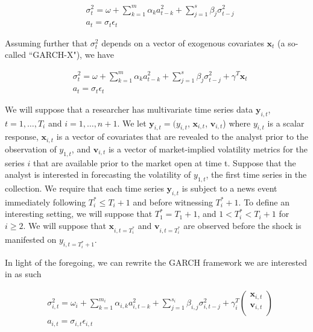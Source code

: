\documentclass[11pt]{article}
\newcommand{\x}{\textbf{x}}
\newcommand{\y}{\textbf{y}}
\theoremstyle{definition}
\begin{document}
\begin{align*}
&\sigma_{t}^{2} = \omega + \sum^{m}_{k=1}\alpha_{k}a^{2}_{t-k} + \sum_{j=1}^{s}\beta_{j}\sigma_{t-j}^{2}\\
&a_{t} = \sigma_{t}\epsilon_{t}
\end{align*}

Assuming further that $\sigma^{2}_{t}$ depends on a vector of exogenous covariates $\x_{t}$ (a so-called ``GARCH-X"), we have

\begin{align*}
&\sigma_{t}^{2} = \omega+ \sum^{m}_{k=1}\alpha_{k}a^{2}_{t-k} + \sum_{j=1}^{s}\beta_{j}\sigma_{t-j}^{2} + \gamma^{T}\x_{t}\\
&a_{t} = \sigma_{t}\epsilon_{t}
\end{align*}


We will suppose that a researcher has multivariate time series data $\y_{i,t}$, $t = 1, \ldots,  T_i$ and $i = 1, \ldots, n+1$. We let $\y_{i,t} = (y_{i,t}$, $\x_{i,t}$, $\textbf{v}_{i,t}$) where $y_{i,t}$ is a scalar response,  $\x_{i,t}$ is a vector of covariates that are revealed to the analyst prior to the observation of $y_{1,t}$, and $\textbf{v}_{i,t}$ is a vector of market-implied volatility metrics for the series $i$ that are available prior to the market open at time t.  Suppose that the analyst is interested in forecasting the volatility of $y_{1,t}$, the first time series in the collection.  We require that each time series $\y_{i,t}$ is subject to a news event immediately following $T^*_i \leq T_i + 1$ and before witnessing $T^*_i+1$. To define an interesting setting, we will suppose that $T^*_1 = T_1 + 1$, and $1 < T^*_i < T_i + 1$ for $i \geq 2$. 
We will suppose that $\x_{i,t=T^*_i}$ and $\textbf{v}_{i,t=T^*_i}$ are observed before the shock is manifested on $y_{i,t=T^*_i+1}$.

In light of the foregoing, we can rewrite the GARCH framework we are interested in as such

\begin{align*}
&\sigma_{i,t}^{2} = \omega_{i} + \sum^{m_{i}}_{k=1}\alpha_{i,k}a^{2}_{i,t-k} + \sum_{j=1}^{s_{i}}\beta_{i,j}\sigma_{i,t-j}^{2} + \gamma_{i}^{T} \begin{pmatrix} \x_{i,t} \\ \textbf{v}_{i,t} \\ \end{pmatrix} \\
&a_{i,t} = \sigma_{i,t}\epsilon_{i,t}
\end{align*}
\end{document}
